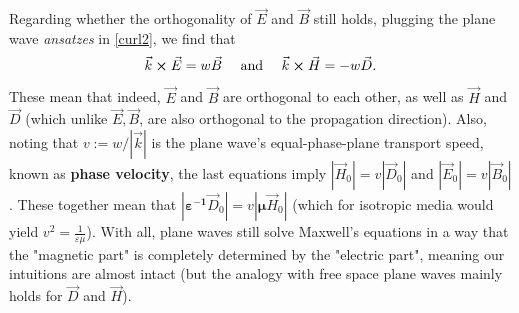 \documentclass[11pt, a4paper, twoside]{article} %
\begin{document}
 Regarding whether the orthogonality of $\vec{E}$ and $\vec{B}$ still holds, plugging the plane wave {\em ansatzes} in \eqref{curl2}, we find that\vspace{-0.1cm}
\begin{equation}\label{Fcurl}
\vec{k}\cross\vec{E}=w\vec{B} \quad \text{           and           }\quad  \vec{k}\cross\vec{H}=-w\vec{D}.\vspace{-0.1cm}
\end{equation}  
These mean that indeed, $\vec{E}$ and $\vec{B}$ are orthogonal to each other, as well as $\vec{H}$ and $\vec{D}$ (which unlike $\vec{E},\vec{B}$, are also orthogonal to the propagation direction). Also, noting that $v:=w/|\vec{k}|$ is the plane wave's equal-phase-plane transport speed, known as {\bf phase velocity}, the last equations imply $|\vec{H}_0|=v|\vec{D}_0|$ and $|\vec{E}_0|=v|\vec{B}_0|$. These together mean that $|\pmb{\varepsilon^{-1}}\vec{D}_0|=v|\pmb{\mu}\vec{H}_0|$ (which for isotropic media would yield $v^2=\frac{1}{\varepsilon\mu}$). With all, plane waves still solve Maxwell's equations in a way that the "magnetic part" is completely determined by the "electric part", meaning our intuitions are almost intact (but the analogy with free space plane waves mainly holds for $\vec{D}$ and $\vec{H}$). \vspace{-0.2cm}
\end{document}
